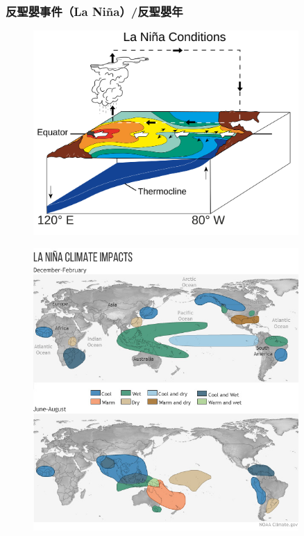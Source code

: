\documentclass[a4paper,12pt]{report}
\begin{document}
\begin{itemize}
\subsubsection{反聖嬰事件（La Niña）/反聖嬰年}
\bct
\begin{figure}[H]
    \centering
    \includegraphics[width=0.9\textwidth]{Nina.png}
\end{figure}\FB
\begin{figure}[H]
    \centering
    \includegraphics[width=0.9\textwidth]{NOAA_Nina.jpg}
\end{figure}\FB\ect

\end{itemize}
\end{document}
